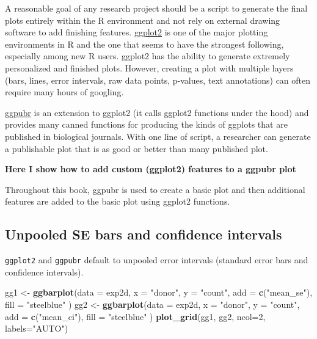 \documentclass[]{book}
\newenvironment{Shaded}{\begin{snugshade}}{\end{snugshade}}
\newcommand{\DataTypeTok}[1]{\textcolor[rgb]{0.13,0.29,0.53}{#1}}
\newcommand{\DecValTok}[1]{\textcolor[rgb]{0.00,0.00,0.81}{#1}}
\newcommand{\KeywordTok}[1]{\textcolor[rgb]{0.13,0.29,0.53}{\textbf{#1}}}
\newcommand{\NormalTok}[1]{#1}
\newcommand{\StringTok}[1]{\textcolor[rgb]{0.31,0.60,0.02}{#1}}
\begin{document}
A reasonable goal of any research project should be a script to generate the final plots entirely within the R environment and not rely on external drawing software to add finishing features. \href{https://ggplot2.tidyverse.org}{ggplot2} is one of the major plotting environments in R and the one that seems to have the strongest following, especially among new R users. ggplot2 has the ability to generate extremely personalized and finished plots. However, creating a plot with multiple layers (bars, lines, error intervals, raw data points, p-values, text annotations) can often require many hours of googling.

\href{https://cran.r-project.org/web/packages/ggpubr/index.html}{ggpubr} is an extension to ggplot2 (it calls ggplot2 functions under the hood) and provides many canned functions for producing the kinds of ggplots that are published in biological journals. With one line of script, a researcher can generate a publishable plot that is as good or better than many published plot.

\textbf{Here I show how to add custom (ggplot2) features to a ggpubr plot}

Throughout this book, ggpubr is used to create a basic plot and then additional features are added to the basic plot using ggplot2 functions.

\hypertarget{unpooled-se-bars-and-confidence-intervals}{%
\subsection{Unpooled SE bars and confidence intervals}\label{unpooled-se-bars-and-confidence-intervals}}

\texttt{ggplot2} and \texttt{ggpubr} default to unpooled error intervals (standard error bars and confidence intervals).

\begin{Shaded}
\begin{Highlighting}[]
\NormalTok{gg1 <-}\StringTok{ }\KeywordTok{ggbarplot}\NormalTok{(}\DataTypeTok{data =}\NormalTok{ exp2d,}
                 \DataTypeTok{x =} \StringTok{"donor"}\NormalTok{, }
                 \DataTypeTok{y =} \StringTok{"count"}\NormalTok{, }
                 \DataTypeTok{add =} \KeywordTok{c}\NormalTok{(}\StringTok{"mean_se"}\NormalTok{),}
                 \DataTypeTok{fill =} \StringTok{"steelblue"}
\NormalTok{)}
\NormalTok{gg2 <-}\StringTok{ }\KeywordTok{ggbarplot}\NormalTok{(}\DataTypeTok{data =}\NormalTok{ exp2d,}
                 \DataTypeTok{x =} \StringTok{"donor"}\NormalTok{, }
                 \DataTypeTok{y =} \StringTok{"count"}\NormalTok{, }
                 \DataTypeTok{add =} \KeywordTok{c}\NormalTok{(}\StringTok{"mean_ci"}\NormalTok{),}
                 \DataTypeTok{fill =} \StringTok{"steelblue"}
\NormalTok{)}
\KeywordTok{plot_grid}\NormalTok{(gg1, gg2, }\DataTypeTok{ncol=}\DecValTok{2}\NormalTok{, }\DataTypeTok{labels=}\StringTok{"AUTO"}\NormalTok{)}
\end{Highlighting}
\end{Shaded}
\end{document}
